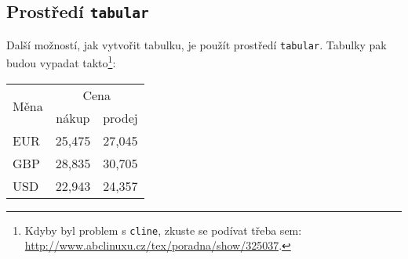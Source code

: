 \documentclass[11pt]{article}
\begin{document}
        \subsection{Prostředí \texttt{tabular}}
            Další možností, jak vytvořit tabulku, je použít prostředí \verb|tabular|.
            Tabulky pak budou vypadat takto\footnote[1]{Kdyby byl problem s \verb|cline|, zkuste se podívat třeba sem: \href{http://www.abclinuxu.cz/tex/poradna/show/325037}{http://www.abclinuxu.cz/tex/poradna/show/325037}.}:

            \begin{center}
                \begin{tabular}{|l|c|c|}
                    \hline
                    \multirow{2}{*}{Měna} & \multicolumn{2}{|c|}{Cena} \\

                                            \cline { 2--3 }
                                            & nákup     & prodej \\

                    \hline
                                EUR         & 25,475    & 27,045    \\
                                GBP         & 28,835    & 30,705    \\
                                USD         & 22,943    & 24,357    \\
                    \hline
                \end{tabular}
            \end{center}
\end{document}
